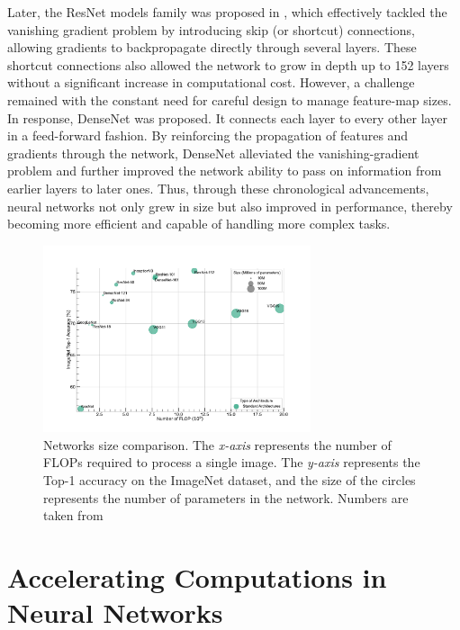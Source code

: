 Later, the ResNet models family was proposed in \cite{DBLP:conf/cvpr/HeZRS16},
which effectively tackled the vanishing gradient problem by introducing skip (or
shortcut) connections, allowing gradients to backpropagate directly through
several layers. These shortcut connections also allowed the network to grow in
depth up to 152 layers without a significant increase in computational cost.
However, a challenge remained with the constant need for careful design to
manage feature-map sizes.\\

In response, DenseNet \cite{huang2017densely} was proposed. It connects each
layer to every other layer in a feed-forward fashion. By reinforcing the
propagation of features and gradients through the network, DenseNet alleviated
the vanishing-gradient problem and further improved the network ability to pass
on information from earlier layers to later ones. Thus, through these
chronological advancements, neural networks not only grew in size but also
improved in performance, thereby becoming more efficient and capable of handling
more complex tasks.

\begin{figure}[htbp]
    \centering
    \includegraphics[width=0.7\textwidth]{chapter_sota/assets/network_sizes_normal.pdf}
    \caption{Networks size comparison. The \emph{x-axis} represents the number
    of \acp{FLOP} required to process a single image. The \emph{y-axis}
    represents the Top-1 accuracy on the ImageNet \cite{deng2009imagenet}
    dataset, and the size of the circles represents the number of parameters in
    the network. Numbers are taken from \cite{pytorch_vision}}
    \label{fig:sota:net_sizes}
\end{figure}

\section{Accelerating Computations in Neural Networks}\label{sec:sota:fast_convolutions}


